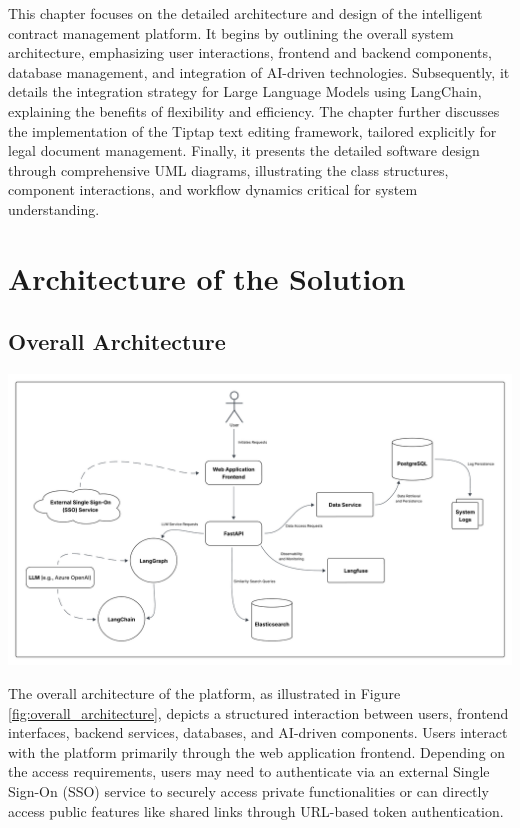 This chapter focuses on the detailed architecture and design of the intelligent contract management platform. It begins by outlining the overall system architecture, emphasizing user interactions, frontend and backend components, database management, and integration of AI-driven technologies. Subsequently, it details the integration strategy for Large Language Models using LangChain, explaining the benefits of flexibility and efficiency. The chapter further discusses the implementation of the Tiptap text editing framework, tailored explicitly for legal document management. Finally, it presents the detailed software design through comprehensive UML diagrams, illustrating the class structures, component interactions, and workflow dynamics critical for system understanding.

\newpage
{}
\hypertarget{thirdchapter}{}

\section{Architecture of the Solution}

\subsection{Overall Architecture}
\begin{center}
    \centering
    \includegraphics[width=1\textwidth]{Images/Global Architecture of the Platform.png}
    \label{fig:overall_architecture}
\end{center}

The overall architecture of the platform, as illustrated in Figure \ref{fig:overall_architecture}, depicts a structured interaction between users, frontend interfaces, backend services, databases, and AI-driven components. Users interact with the platform primarily through the web application frontend. Depending on the access requirements, users may need to authenticate via an external Single Sign-On (SSO) service to securely access private functionalities or can directly access public features like shared links through URL-based token authentication.\mynewline


